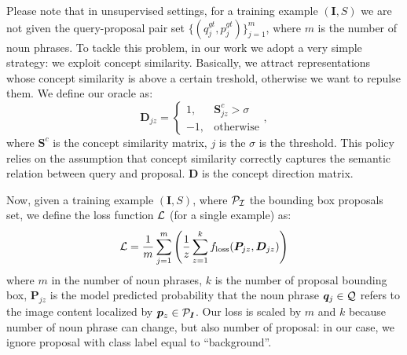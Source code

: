 \documentclass{article}
\begin{document}
Please note that in unsupervised settings, for a training example
$\left( \bm{I}, S \right)$ we are not given the query-proposal pair
set $\{ ( q^{gt}_j, p^{gt}_j ) \}^m_{j=1}$, where $m$ is the number of
noun phrases.
To tackle this problem, in our work we adopt a very simple strategy:
we exploit concept similarity. Basically, we attract representations
whose concept similarity is above a certain treshold, otherwise we
want to repulse them. We define our oracle as:
\begin{equation}
  \bm{D}_{jz} =
  \begin{cases}
    1, & \bm{S}^c_{jz} > \sigma \\
    -1, & \text{otherwise}
  \end{cases},
\end{equation}
where $\bm{S}^c$ is the concept similarity matrix, $j$ is the  $\sigma$ is the
threshold. This policy relies on the assumption that concept
similarity correctly captures the semantic relation between query and
proposal. $\bm{D}$ is the concept direction matrix.

Now, given a training example $\left( \bm{I}, S \right)$, where
$\cal{P}_{\bm{I}}$ the bounding box proposals set, we define the loss
function $\mathcal{L}$ (for a single example) as:
\begin{equation}
  \mathcal{L} = \frac{1}{m} \sum^m_{j=1} \Bigg( \frac{1}{z} \sum^k_{z=1} f_{\text{loss}} ( \bm{P}_{jz}, \bm{D}_{jz} ) \Bigg)
\end{equation}
where $m$ in the number of noun phrases, $k$ is the number of proposal
bounding box, $\bm{P}_{jz}$ is the model predicted probability that
the noun phrase $\bm{q}_j \in \mathcal{Q}$ refers to the image content
localized by $\bm{p}_z \in \mathcal{P}_{\bm{I}}$. Our loss is scaled by $m$
and $k$ because number of noun phrase can change, but also number of
proposal: in our case, we ignore proposal with class label equal to
``background''. 
\end{document}
